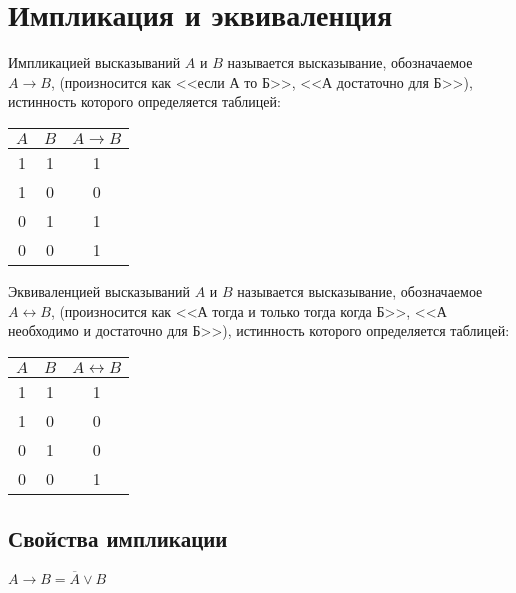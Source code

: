 \section{Импликация и эквиваленция}

\begin{definition}[Импликация]
	Импликацией высказываний $A$ и $B$ называется высказывание, обозначаемое $A \rightarrow B$, (произносится как <<если А то Б>>, <<А достаточно для Б>>), истинность которого определяется таблицей:
	\begin{center}
		\begin{tabular}{ |c|c|c| } 
			\hline
			$A$ & $B$ & $A \rightarrow B$ \\
			\hline 
			1 & 1 & 1 \\ 
			1 & 0 & 0 \\
			0 & 1 & 1 \\ 
			0 & 0 & 1 \\  
			\hline
		\end{tabular}
	\end{center}
\end{definition}

\begin{definition}[Эквиваленция]
	Эквиваленцией высказываний $A$ и $B$ называется высказывание, обозначаемое $A \leftrightarrow B$, (произносится как <<А тогда и только тогда когда Б>>, <<А необходимо и достаточно для Б>>), истинность которого определяется таблицей:
	\begin{center}
		\begin{tabular}{ |c|c|c| } 
			\hline
			$A$ & $B$ & $A \leftrightarrow B$ \\
			\hline 
			1 & 1 & 1 \\ 
			1 & 0 & 0 \\
			0 & 1 & 0 \\ 
			0 & 0 & 1 \\  
			\hline
		\end{tabular}
	\end{center}
\end{definition}

\subsection{Свойства импликации}

\begin{theorem} \label{thm:1.3.1}
	$A \rightarrow B = \overline{A} \lor B$
\end{theorem}

